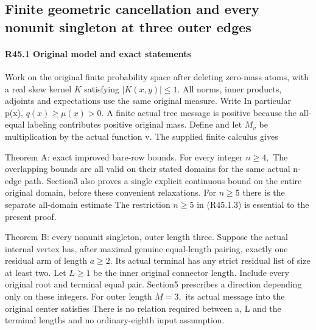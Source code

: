 \subsection{Finite geometric cancellation and every nonunit singleton at three outer edges}\label{proof:R2-C045}
\paragraph{R45.1 Original model and exact statements}

Work on the original finite probability space after deleting zero-mass atoms,
with a real skew kernel \(K\) satisfying \(|K(x,\allowbreak y)|\le1\).
All norms, inner products, adjoints and expectations use the same original measure.
Write
In particular p(x), \(q(x)\ge \mu(x)>0.\) A finite actual tree message is positive
because the all-equal labeling contributes positive original mass.
Define
and let \(M_v\) be multiplication by the actual function v. The supplied
finite calculus gives

Theorem A: exact improved bare-row bounds. For every integer \(n\ge 4,\allowbreak \)
The overlapping bounds are all valid on their stated domains for the
same actual n-edge path. Section3 also proves a single explicit continuous
bound on the entire original domain, before these convenient relaxations.
For \(n\ge 5\) there is the separate all-domain estimate
The restriction \(n\ge 5\) in (R45.1.3) is essential to the present proof.

Theorem B: every nonunit singleton, outer length three. Suppose the
actual internal vertex has, after maximal genuine equal-length pairing,
exactly one residual arm of length \(a\ge 2.\) Its actual terminal has any
strict residual list of size at least two. Let \(L\ge 1\) be the inner original
connector length. Include every original root and terminal equal pair.
Section5 prescribes a direction depending only on these integers. For
outer length \(M=3,\allowbreak \) its actual message into the original center satisfies
There is no relation required between a, L and the terminal lengths and
no ordinary-eighth input assumption. 


